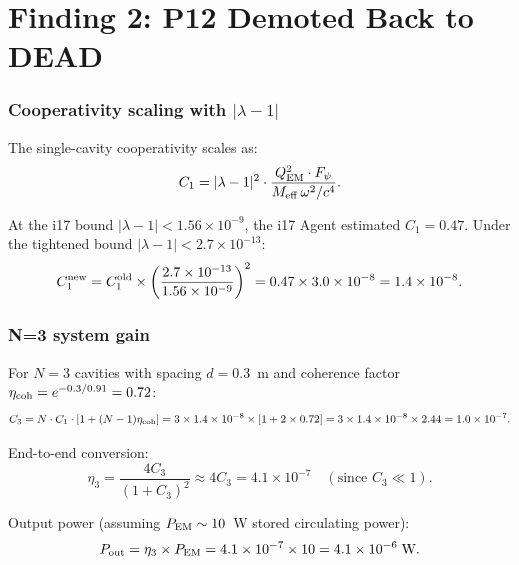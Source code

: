 \documentclass[11pt]{article}
\newcommand{\ee}[1]{\times 10^{#1}}
\newcommand{\lbone}{|\lambda - 1|}
\begin{document}
\part{Finding 2: P12 Demoted Back to DEAD}
\label{part:p12}

\section{Cooperativity scaling with $\lbone$}

The single-cavity cooperativity scales as:
\begin{equation}
C_1 = \lbone^2 \cdot \frac{Q_{\rm EM}^2 \cdot F_\psi}
{M_{\rm eff}\,\omega^2/c^4}.
\label{eq:cooperativity}
\end{equation}

At the i17 bound $\lbone < 1.56\ee{-9}$, the i17 Agent estimated
$C_1 = 0.47$. Under the tightened bound $\lbone < 2.7\ee{-13}$:
\begin{equation}
C_1^{\rm new} = C_1^{\rm old} \times \left(\frac{2.7\ee{-13}}
{1.56\ee{-9}}\right)^2 = 0.47 \times 3.0\ee{-8} = 1.4\ee{-8}.
\end{equation}

\section{N=3 system gain}

For $N = 3$ cavities with spacing $d = 0.3$~m and coherence factor
$\eta_{\rm coh} = e^{-0.3/0.91} = 0.72$:
\begin{equation}
C_3 = N \cdot C_1 \cdot [1 + (N-1)\eta_{\rm coh}]
= 3 \times 1.4\ee{-8} \times [1 + 2 \times 0.72]
= 3 \times 1.4\ee{-8} \times 2.44 = 1.0\ee{-7}.
\end{equation}

End-to-end conversion:
\begin{equation}
\eta_3 = \frac{4C_3}{(1+C_3)^2} \approx 4C_3 = 4.1\ee{-7}
\quad (\text{since } C_3 \ll 1).
\end{equation}

Output power (assuming $P_{\rm EM} \sim 10$~W stored circulating power):
\begin{equation}
P_{\rm out} = \eta_3 \times P_{\rm EM} = 4.1\ee{-7} \times 10
= 4.1\ee{-6}\;\text{W}.
\end{equation}
\end{document}
